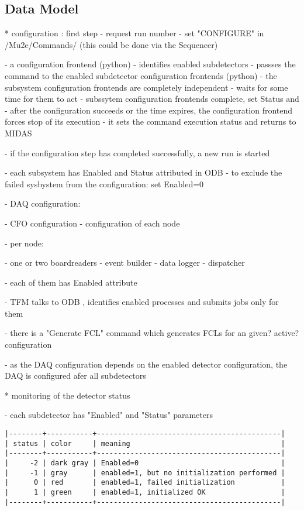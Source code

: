 \subsection{Data Model}

* configuration  : first step                                                
- request run number
- set "CONFIGURE" in /Mu2e/Commands/ (this could be done via the Sequencer)

- a configuration frontend (python)
  - identifies enabled subdetectors
  - passses the command to the enabled subdetector configuration frontends (python)
  - the subsystem configuration frontends are completely independent
  - waits for some time for them to act
  - subssytem configuration frontends complete, set Status and 
  - after the configuration succeeds or the time expires, the configuration
    frontend forces stop of its execution
  - it sets the command execution status and returns to MIDAS

- if the configuration step has completed successfully, a new run is started

- each subsystem has Enabled and Status attributed in ODB
- to exclude the failed sysbystem from the configuration: set Enabled=0

- DAQ configuration:

  - CFO configuration
  - configuration of each node

  - per node:

    - one or two boardreaders
    - event builder
    - data logger
    - dispatcher

    - each of them has Enabled attribute

  - TFM talks to ODB , identifies enabled processes and submits jobs only
    for them

  - there is a "Generate FCL" command which generates FCLs
    for an given? active? configuration

- as the DAQ configuration depends on the enabled detector configuration,
  the DAQ is configured afer all subdetectors 


* monitoring of the detector status                                          

- each subdetector has "Enabled" and "Status" parameters
\begin{verbatim}
|--------+-----------+--------------------------------------------|
| status | color     | meaning                                    |
|--------+-----------+--------------------------------------------|
|     -2 | dark gray | Enabled=0                                  |
|     -1 | gray      | enabled=1, but no initialization performed |
|      0 | red       | enabled=1, failed initialization           |
|      1 | green     | enabled=1, initialized OK                  |
|--------+-----------+--------------------------------------------|
\end{verbatim}

